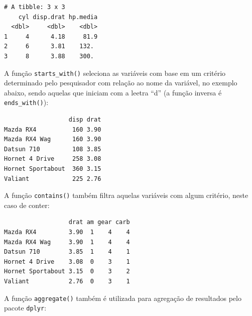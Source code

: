 \documentclass[12pt,brazil,oneside]{book}
\newenvironment{Shaded}{\begin{snugshade}}{\end{snugshade}}
\newcommand{\KeywordTok}[1]{\textcolor[rgb]{0.13,0.29,0.53}{\textbf{#1}}}
\newcommand{\NormalTok}[1]{#1}
\newcommand{\OperatorTok}[1]{\textcolor[rgb]{0.81,0.36,0.00}{\textbf{#1}}}
\newcommand{\StringTok}[1]{\textcolor[rgb]{0.31,0.60,0.02}{#1}}
\begin{document}
\begin{verbatim}
# A tibble: 3 x 3
    cyl disp.drat hp.media
  <dbl>     <dbl>    <dbl>
1     4      4.18     81.9
2     6      3.81    132. 
3     8      3.88    300. 
\end{verbatim}

A função \texttt{starts\_with()} seleciona as variáveis com base em um critério determinado pelo pesquisador com relação ao nome da variável, no exemplo abaixo, sendo aquelas que iniciam com a leetra ``d'' (a função inversa é \texttt{ends\_with()}):

\begin{Shaded}
\end{Shaded}

\begin{verbatim}
                  disp drat
Mazda RX4          160 3.90
Mazda RX4 Wag      160 3.90
Datsun 710         108 3.85
Hornet 4 Drive     258 3.08
Hornet Sportabout  360 3.15
Valiant            225 2.76
\end{verbatim}

A função \texttt{contains()} também filtra aquelas variáveis com algum critério, neste caso de conter:

\begin{Shaded}
\end{Shaded}

\begin{verbatim}
                  drat am gear carb
Mazda RX4         3.90  1    4    4
Mazda RX4 Wag     3.90  1    4    4
Datsun 710        3.85  1    4    1
Hornet 4 Drive    3.08  0    3    1
Hornet Sportabout 3.15  0    3    2
Valiant           2.76  0    3    1
\end{verbatim}

A função \texttt{aggregate()} também é utilizada para agregação de resultados pelo pacote \texttt{dplyr}:

\begin{Shaded}
\end{Shaded}
\end{document}

